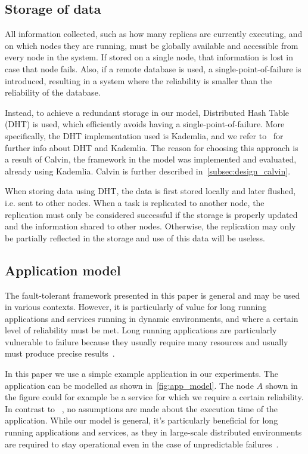 \documentclass{cslthse-msc}
\begin{document}
\subsection{Storage of data} \label{subsec:design_storage}
All information collected, such as how many replicas are currently executing, and on which nodes they are running, must be globally available and accessible from every node in the system. If stored on a single node, that information is lost in case that node fails. Also, if a remote database is used, a single-point-of-failure is introduced, resulting in a system where the reliability is smaller than the reliability of the database. 

Instead, to achieve a redundant storage in our model, Distributed Hash Table (DHT) is used, which efficiently avoids having a single-point-of-failure. More specifically, the DHT implementation used is Kademlia, and we refer to~\cite{kademlia} for further info about DHT and Kademlia. The reason for choosing this approach is a result of Calvin, the framework in the model was implemented and evaluated, already using Kademlia. Calvin is further described in~\cref{subsec:design_calvin}.

When storing data using DHT, the data is first stored locally and later flushed, i.e. sent to other nodes. When a task is replicated to another node, the replication must only be considered successful if the storage is properly updated and the information shared to other nodes. Otherwise, the replication may only be partially reflected in the storage and use of this data will be useless. 

\subsection{Application model} \label{subsec:design_app_model}
The fault-tolerant framework presented in this paper is general and may be used in various contexts. However, it is particularly of value for long running applications and services running in dynamic environments, and where a certain level of reliability must be met. Long running applications are particularly vulnerable to failure because they usually require many resources and usually must produce precise results~\cite{relGridSystems}.

In this paper we use a simple example application in our experiments. The application can be modelled as shown in~\cref{fig:app_model}. The node $A$ shown in the figure could for example be a service for which we require a certain reliability. In contrast to ~\cite{algoOptTimeMaxRel, optTaskAllocationForMaxRel, taskAllocation, taskAllocationSwarm, algoMaxRelEndToEndConstraint, algoMinExTime, schedReplicas}, no assumptions are made about the execution time of the application. While our model is general, it's particularly beneficial for long running applications and services, as they in large-scale distributed environments are required to stay operational even in the case of unpredictable failures~\cite{imprRelAdaptRL}.
\end{document}
